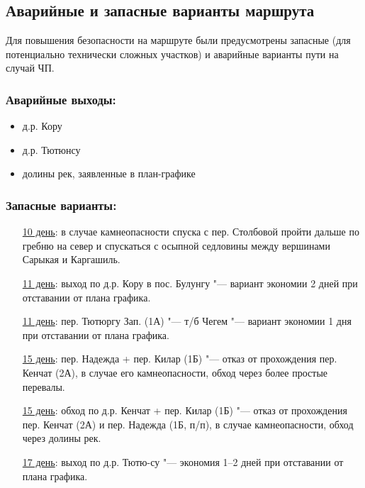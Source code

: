 	\subsection{Аварийные и запасные варианты маршрута}
		Для повышения безопасности на маршруте были предусмотрены запасные (для потенциально технически сложных участков) и 
		аварийные варианты пути  на случай ЧП.

		\subsubsection*{Аварийные выходы:}
			\begin{itemize}
				\item д.р. Кору
				\item д.р. Тютюнсу
				\item долины рек, заявленные в план-графике
			\end{itemize}

		\subsubsection*{Запасные варианты:}
			\settowidth{\tmplen}{10 день: }
			\addtolength{\tmplen}{\leftmargin}
			\begin{enumerate}[leftmargin=\tmplen]
				\item[\uline{10 день}:] в случае камнеопасности спуска с пер. Столбовой пройти дальше по гребню на север и спускаться с осыпной седловины между вершинами Сарыкая и Каргашиль.
				\item[\uline{11 день}:] выход по д.р. Кору в пос. Булунгу "--- вариант экономии 2 дней при отставании от плана графика.
				\item[\uline{11 день}:] пер. Тютюргу Зап. (1А) "--- т/б Чегем "--- вариант экономии 1 дня при отставании от плана графика.
				\item[\uline{15 день}:] пер. Надежда + пер. Килар (1Б) "--- отказ от прохождения пер. Кенчат (2А), в случае его камнеопасности, обход через более простые перевалы.
				\item[\uline{15 день}:] обход по д.р. Кенчат + пер. Килар (1Б) "--- отказ от прохождения пер. Кенчат (2А) и пер. Надежда (1Б, п/п), в случае камнеопасности, обход через долины рек.
				\item[\uline{17 день}:] выход по д.р. Тютю-су "---  экономия 1--2 дней при отставании от плана графика.
			\end{enumerate}
		
